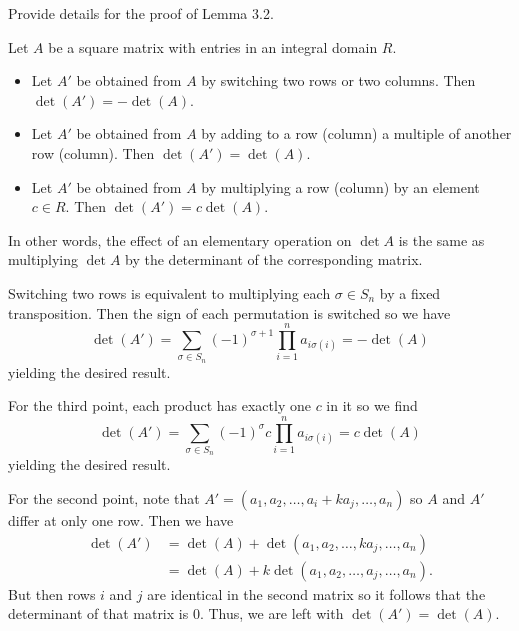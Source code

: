 \documentclass[../../master.tex]{subfiles}
\begin{document}
\begin{problem}
    Provide details for the proof of Lemma 3.2.
    \begin{proposition}[Lemma 3.2] 
        Let $A$ be a square matrix with entries in an integral domain $R$.
        \begin{itemize}
            \item Let $A'$ be obtained from $A$ by switching two rows or two columns.
                Then $\det(A') = -\det(A)$.
            \item Let $A'$ be obtained from $A$ by adding to a row (column) a multiple of another row (column).
                Then $\det(A') = \det(A)$.
            \item Let $A'$ be obtained from $A$ by multiplying a row (column) by an element $c \in R$.
                Then $\det(A') = c \det(A)$.
        \end{itemize}
        In other words, the effect of an elementary operation on $\det A$ is the same as multiplying $\det A$ by the determinant of the corresponding matrix.
    \end{proposition}
\end{problem}

\begin{solution}
    Switching two rows is equivalent to multiplying each $\sigma \in S_n$ by a fixed transposition.
    Then the sign of each permutation is switched so we have
    \[
        \det(A') = \sum_{\sigma \in S_n} (-1)^{\sigma + 1} \prod_{i=1}^{n} a_{i \sigma(i)} = -\det(A)
    \]
    yielding the desired result.

    For the third point, each product has exactly one $c$ in it so we find
    \[
        \det(A') = \sum_{\sigma \in S_n} (-1)^{\sigma} c \prod_{i=1}^{n} a_{i \sigma(i)} = c \det(A)
    \]
    yielding the desired result.

    For the second point, note that $A' = (a_1, a_2, \ldots, a_i + ka_j, \ldots, a_n)$ so $A$ and $A'$ differ at only one row.
    Then we have
    \begin{align*}
        \det(A') &= \det(A) + \det(a_1, a_2, \ldots, ka_j, \ldots, a_n) \\
                 &= \det(A) + k\det(a_1, a_2, \ldots, a_j, \ldots, a_n).
    \end{align*}
    But then rows $i$ and $j$ are identical in the second matrix so it follows that the determinant of that matrix is 0.
    Thus, we are left with $\det(A') = \det(A)$.
\end{solution}
\end{document}

